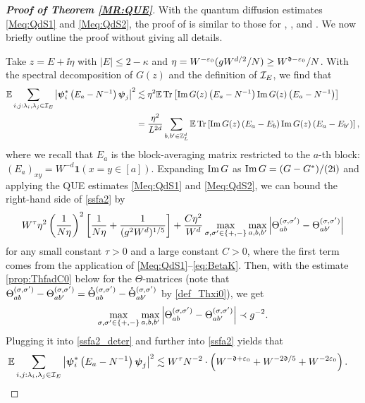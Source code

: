 \begin{proof}[\bf Proof of Theorem \ref{MR:QUE}]  
With the quantum diffusion estimates \eqref{Meq:QdS1} and \eqref{Meq:QdS2}, the proof of  is similar to those for \cite[Theorem 2.5]{YY_25}, \cite[Theorem 2.4]{DYYY25}, and \cite[Theorem 2.2]{RBSO1D}. We now briefly outline the proof without giving all details. 

Take $z=E+\ii\eta$ with $|E|\le 2-\kappa$ and $\eta=W^{-\e_0}({\ilambda W^{d/2}}/N)\ge W^{\fd-\e_0}/N$. With the spectral decomposition of $G(z)$ and the definition of $ {\cal I}_E$, we find that 
\begin{align}\label{ssfa2}
\E \sum_{i,j: \lambda_i,\lambda_j\in {\cal I}_E} \left|\bpsi_i^*\left(E_{a}-N^{-1}\right) \bpsi_j\right|^2 &\lesssim \eta^2 \E \tr \left[\operatorname{Im} G(z)\left(E_{a}-N^{-1}\right) \operatorname{Im} G(z)\left(E_{a}-N^{-1}\right)\right] \nonumber \\
&=\frac{\eta^2}{L^{2d}}\sum_{b,b'\in \Zn}
\E  
 \tr \left[\operatorname{Im} G(z)\left(E_{a}-E_{b}\right) \operatorname{Im} G(z)\left(E_{a}-E_{b'}\right)\right],
\end{align}
where we recall that $E_a$ is the block-averaging matrix restricted to the $a$-th block: $(E_a)_{xy} = W^{-d}\mathbf 1(x=y\in [a])$. Expanding $\im G$ as $\im G=(G-G^*)/(2\ii)$ and applying the QUE estimates \eqref{Meq:QdS1} and \eqref{Meq:QdS2}, we can bound the right-hand side of \eqref{ssfa2} by   
\begin{align}\label{ssfa2_deter}
    W^\tau \eta^2 \p{\frac{1}{N\eta}}^2\left[\frac{1}{N\eta} + \frac{1}{(\ilambda^2W^d)^{1/5}}\right]+  \frac{C\eta^2}{W^d} \max_{\sig,\sig'\in \{+,-\}}\max_{a,b,b'}\left|\Theta^{(\sig,\sig')}_{ab}-\Theta^{(\sig,\sig')}_{ab'}\right|
\end{align}
for any small constant $\tau>0$ and a large constant $C>0$, where the first term comes from the application of \eqref{Meq:QdS1}--\eqref{eq:BetaK}. 
Then, with the estimate \eqref{prop:ThfadC0} below for the $\Theta$-matrices (note that $\Theta^{(\sig,\sig')}_{ab}-\Theta^{(\sig,\sig')}_{ab'}=\zTheta^{(\sig,\sig')}_{ab}-\zTheta^{(\sig,\sig')}_{ab'}$ by \eqref{def_Thxi0}), we get 
$$
\max_{\sig,\sig'\in \{+,-\}}\max_{a,b,b'}\left|\Theta^{(\sig,\sig')}_{ab}-\Theta^{(\sig,\sig')}_{ab'}\right|\prec \ilambda^{-2} .
$$
Plugging it into \eqref{ssfa2_deter} and further into \eqref{ssfa2} yields that 
\begin{align*}
\E \sum_{i,j: \lambda_i,\lambda_j\in {\cal I}_E} \left|\bpsi_i^*\left(E_{a}-N^{-1}\right) \bpsi_j\right|^2 &\lesssim {W^\tau}N^{-2}\cdot \p{W^{-\fd+\e_0}+W^{-2\fd/5}+W^{-2\e_0}}. 

\end{align*}
\end{proof}
